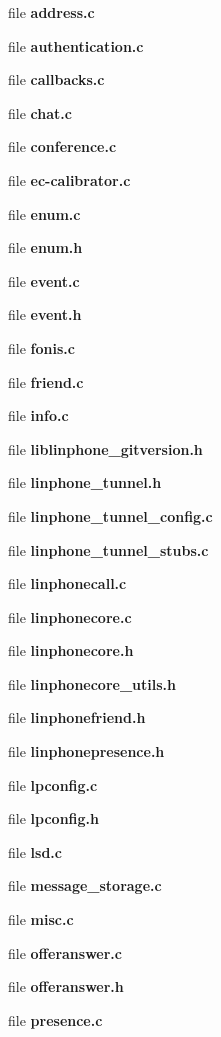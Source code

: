 \begin{DoxyCompactItemize}
\item 
file {\bfseries address.\-c}
\item 
file {\bfseries authentication.\-c}
\item 
file {\bfseries callbacks.\-c}
\item 
file {\bfseries chat.\-c}
\item 
file {\bfseries conference.\-c}
\item 
file {\bfseries ec-\/calibrator.\-c}
\item 
file {\bfseries enum.\-c}
\item 
file {\bfseries enum.\-h}
\item 
file {\bfseries event.\-c}
\item 
file {\bfseries event.\-h}
\item 
file {\bfseries fonis.\-c}
\item 
file {\bfseries friend.\-c}
\item 
file {\bfseries info.\-c}
\item 
file {\bfseries liblinphone\-\_\-gitversion.\-h}
\item 
file {\bfseries linphone\-\_\-tunnel.\-h}
\item 
file {\bfseries linphone\-\_\-tunnel\-\_\-config.\-c}
\item 
file {\bfseries linphone\-\_\-tunnel\-\_\-stubs.\-c}
\item 
file {\bfseries linphonecall.\-c}
\item 
file {\bfseries linphonecore.\-c}
\item 
file {\bfseries linphonecore.\-h}
\item 
file {\bfseries linphonecore\-\_\-utils.\-h}
\item 
file {\bfseries linphonefriend.\-h}
\item 
file {\bfseries linphonepresence.\-h}
\item 
file {\bfseries lpconfig.\-c}
\item 
file {\bfseries lpconfig.\-h}
\item 
file {\bfseries lsd.\-c}
\item 
file {\bfseries message\-\_\-storage.\-c}
\item 
file {\bfseries misc.\-c}
\item 
file {\bfseries offeranswer.\-c}
\item 
file {\bfseries offeranswer.\-h}
\item 
file {\bfseries presence.\-c}
\item 

\end{DoxyCompactItemize}

